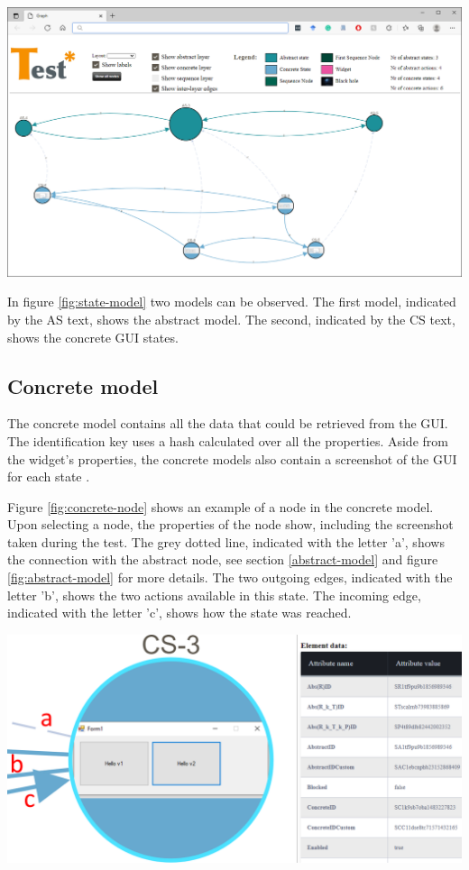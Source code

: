 \bigskip
\begingroup
\captionsetup{type=figure}
\includegraphics[scale=0.38]{images/state-model.png}
\label{fig:state-model}
\endgroup

In figure \ref{fig:state-model} two models can be observed. The first model, indicated by the AS text, shows the abstract model. The second, indicated by the CS text, shows the concrete GUI states. 

\subsection{Concrete model}
The concrete model contains all the data that could be retrieved from the GUI. The identification key uses a hash calculated over all the properties. Aside from the widget's properties, the concrete models also contain a screenshot of the GUI for each state \cite{thesisMulders}.

Figure \ref{fig:concrete-node} shows an example of a node in the concrete model. Upon selecting a node, the properties of the node show, including the screenshot taken during the test. The grey dotted line, indicated with the letter 'a', shows the connection with the abstract node, see section \ref{abstract-model} and figure \ref{fig:abstract-model} for more details. The two outgoing edges, indicated with the letter 'b', shows the two actions available in this state. The incoming edge, indicated with the letter 'c', shows how the state was reached. 

\bigskip
\begingroup
\captionsetup{type=figure}
\includegraphics[scale=0.5]{images/concrete-model.png}
\label{fig:concrete-node}
\endgroup

